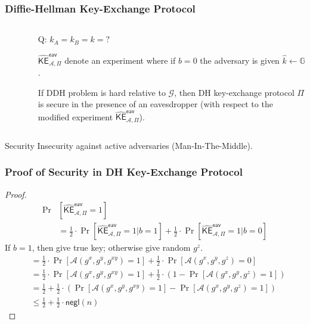\begin{frame}\frametitle{Diffie-Hellman Key-Exchange Protocol}
\begin{columns}[]
\begin{column}{5cm}
\begin{figure}
\begin{center}

\end{center}
\end{figure}
\end{column}
\begin{column}{6cm}
\alert{Q: $k_A = k_B = k = ?$}
\newline
	
$\widehat{\mathsf{KE}}^{\mathsf{eav}}_{\mathcal{A},\Pi}$ denote an experiment where if $b=0$ the adversary is given $\hat{k} \gets \mathbb{G}$.
\begin{theorem}
If DDH problem is hard relative to $\mathcal{G}$, then DH key-exchange protocol $\Pi$ is secure in the presence of an eavesdropper (with respect to the modified experiment $\widehat{\mathsf{KE}}^{\mathsf{eav}}_{\mathcal{A},\Pi}$). 
\end{theorem}
\end{column}
\end{columns}
\begin{alertblock}{Security}
Insecurity against active adversaries (Man-In-The-Middle).
\end{alertblock}
\end{frame}
\begin{frame}\frametitle{Proof of Security in DH Key-Exchange Protocol}
\begin{proof}
\begin{align*}
\Pr & \left[ \widehat{\mathsf{KE}}^{\mathsf{eav}}_{\mathcal{A},\Pi} =1\right] \\	
&= \frac{1}{2}\cdot \Pr\left[ \widehat{\mathsf{KE}}^{\mathsf{eav}}_{\mathcal{A},\Pi} =1 | b=1\right] + \frac{1}{2}\cdot \Pr\left[ \widehat{\mathsf{KE}}^{\mathsf{eav}}_{\mathcal{A},\Pi} =1 | b=0\right]
\end{align*}
If $b=1$, then give true key; otherwise give random $g^z$.
\begin{align*}
&= \frac{1}{2}\cdot \Pr\left[ \mathcal{A}(g^x,g^y,g^{xy})=1 \right] + \frac{1}{2}\cdot \Pr\left[ \mathcal{A}(g^x,g^y,g^z)=0 \right]\\
&= \frac{1}{2}\cdot \Pr\left[ \mathcal{A}(g^x,g^y,g^{xy})=1 \right] + \frac{1}{2}\cdot (1-\Pr\left[ \mathcal{A}(g^x,g^y,g^z)=1 \right])\\
&= \frac{1}{2} + \frac{1}{2}\cdot \left( \Pr\left[ \mathcal{A}(g^x,g^y,g^{xy})=1 \right] - \Pr\left[ \mathcal{A}(g^x,g^y,g^z)=1 \right] \right)\\
&\le \frac{1}{2} + \frac{1}{2}\cdot \mathsf{negl}(n) %
\end{align*}
\end{proof}
\end{frame}
